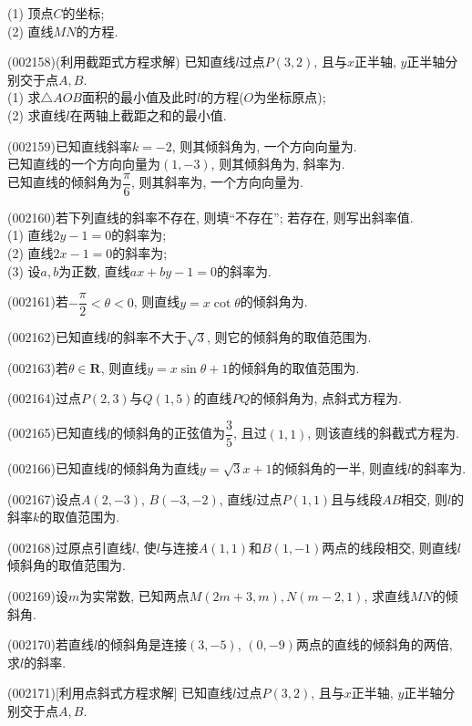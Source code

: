 (1) 顶点$C$的坐标;\\ 
(2) 直线$MN$的方程.
\item (002158)(利用截距式方程求解)
已知直线$l$过点$P(3,2)$, 且与$x$正半轴, $y$正半轴分别交于点$A,B$.\\ 
(1) 求$\triangle AOB$面积的最小值及此时$l$的方程($O$为坐标原点);\\ 
(2) 求直线$l$在两轴上截距之和的最小值.
\item (002159)已知直线斜率$k=-2$, 则其倾斜角为, 一个方向向量为.\\ 
已知直线的一个方向向量为$(1,-3)$, 则其倾斜角为, 斜率为.\\ 
已知直线的倾斜角为$\dfrac{\pi}{6}$, 则其斜率为, 一个方向向量为.
\item (002160)若下列直线的斜率不存在, 则填``不存在''; 若存在, 则写出斜率值.\\ 
(1) 直线$2y-1=0$的斜率为;\\ 
(2) 直线$2x-1=0$的斜率为;\\ 
(3) 设$a,b$为正数, 直线$ax+by-1=0$的斜率为.
\item (002161)若$-\dfrac{\pi}{2}<\theta<0$, 则直线$y=x\cot\theta$的倾斜角为.
\item (002162)已知直线$l$的斜率不大于$\sqrt{3}$, 则它的倾斜角的取值范围为.
\item (002163)若$\theta\in \mathbf{R}$, 则直线$y=x\sin\theta+1$的倾斜角的取值范围为.
\item (002164)过点$P(2,3)$与$Q(1,5)$的直线$PQ$的倾斜角为, 点斜式方程为.
\item (002165)已知直线$l$的倾斜角的正弦值为$\dfrac{3}{5}$, 且过$(1,1)$, 则该直线的斜截式方程为.
\item (002166)已知直线$l$的倾斜角为直线$y=\sqrt{3}x+1$的倾斜角的一半, 则直线$l$的斜率为.
\item (002167)设点$A(2,-3)$, $B(-3,-2)$, 直线$l$过点$P(1,1)$且与线段$AB$相交,
则$l$的斜率$k$的取值范围为.
\item (002168)过原点引直线$l$, 使$l$与连接$A(1,1)$和$B(1,-1)$两点的线段相交,
则直线$l$倾斜角的取值范围为.
\item (002169)设$m$为实常数, 已知两点$M(2m+3,m),N(m-2,1)$, 求直线$MN$的倾斜角.
\item (002170)若直线$l$的倾斜角是连接$(3,-5)$, $(0,-9)$两点的直线的倾斜角的两倍, 求$l$的斜率.
\item (002171)[利用点斜式方程求解]
已知直线$l$过点$P(3,2)$, 且与$x$正半轴, $y$正半轴分别交于点$A,B$.\\ 
